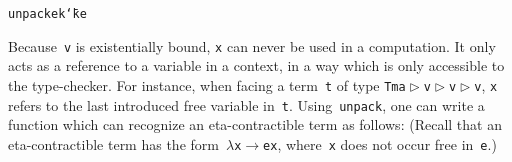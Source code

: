 \documentclass[9pt,authoryear]{sigplanconf}
\begin{document}
{{}\vphantom{$\{$}}\texttt{unpack}\texttt{\mbox{\hspace{0.50em}}}\texttt{e}\texttt{\mbox{\hspace{0.50em}}}\texttt{k}\texttt{\mbox{\hspace{0.50em}}}\texttt{{\char `\=}}\texttt{\mbox{\hspace{0.50em}}}\texttt{k}\texttt{\mbox{\hspace{0.50em}}}\texttt{\makebox[1.22ex][l]{$ {(} $}}\texttt{\makebox[1.22ex][r]{$ {)} $}}\texttt{\mbox{\hspace{0.50em}}}\texttt{e}\texttt{{\nopagebreak \newline%
}\vphantom{$\{$}}%


%
Because{~}\texttt{v} is existentially bound, \texttt{x} can never be used in a
    computation. It only acts as a reference to a variable in a context,
    in a way which is only accessible to the type-checker.
    For instance, when facing a term{~}\texttt{t} of type
    \texttt{Tm}\texttt{\mbox{\hspace{0.50em}}}\texttt{\makebox[1.22ex][l]{$ {(} $}}\texttt{a}\texttt{\mbox{\hspace{0.50em}}}\texttt{$ \vartriangleright $}\texttt{\mbox{\hspace{0.50em}}}\texttt{v}\texttt{\mbox{\hspace{0.50em}}}\texttt{$ \vartriangleright $}\texttt{\mbox{\hspace{0.50em}}}\texttt{v}\texttt{\mbox{\hspace{0.50em}}}\texttt{$ \vartriangleright $}\texttt{\mbox{\hspace{0.50em}}}\texttt{v}\texttt{\makebox[1.22ex][r]{$ {)} $}}, \texttt{x} refers to the last introduced free
    variable in{~}\texttt{t}.
    Using{~}\texttt{unpack}, one can write a function which can recognize an
    eta-contractible term as follows{:} (Recall that an eta-contractible
    term has the form{~}\texttt{$ \lambda $}\texttt{\mbox{\hspace{0.50em}}}\texttt{x}\texttt{\mbox{\hspace{0.50em}}}\texttt{$ \rightarrow $}\texttt{\mbox{\hspace{0.50em}}}\texttt{e}\texttt{\mbox{\hspace{0.50em}}}\texttt{x}, where{~}\texttt{x} does not occur free
    in{~}\texttt{e}.)%


{\nopagebreak }
\end{document}
